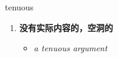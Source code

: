 
\begin{frame}
{\huge tenuous}
\begin{center}
\begin{enumerate}\Large
  \item \textbf{没有实际内容的，空洞的}
  \begin{itemize}
    \item \em{\Large{a tenuous argument}}
  \end{itemize}
\end{enumerate}
\end{center}
\end{frame}
